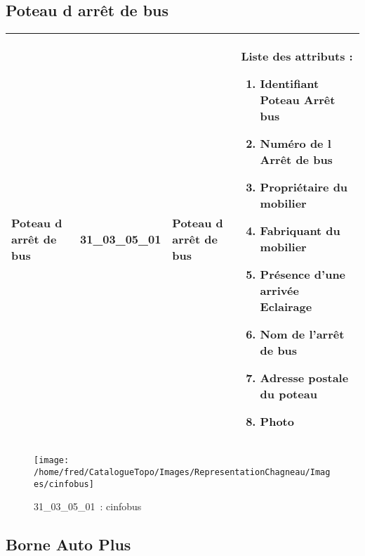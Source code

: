 \documentclass[12pt,titlepage]{book}
\begin{document}
\subsection{Poteau d arrêt de bus}
\noindent
\vspace{\baselineskip}

\renewcommand{\arraystretch}{1.2}
\begin{supertabular}{|p{10cm}|c|p{13cm}|p{12cm}|}
 Poteau d arrêt de bus & 31\_03\_05\_01 & Poteau d arrêt de bus & Liste des attributs :
\begin{enumerate}
  \item Identifiant Poteau Arrêt bus  \item Numéro de l Arrêt de bus  \item Propriétaire du mobilier  \item Fabriquant du mobilier  \item Présence d'une arrivée Eclairage  \item Nom de l'arrêt de bus  \item Adresse postale du poteau  \item Photo\end{enumerate}
\\
\hline
\end{supertabular}
\begin{figure}[h!]
  \hfill         %
  \begin{minipage}[t]{3cm}
    \begin{center}
      \texttt{[image: /home/fred/CatalogueTopo/Images/RepresentationChagneau/Images/cinfobus]}
      \caption[~31\_03\_05\_01]{\small{31\_03\_05\_01~:} \tiny{cinfobus}}\label{cinfobus}
    \end{center}
  \end{minipage}
\end{figure}


\subsection{Borne Auto Plus}
\noindent
\vspace{\baselineskip}
\end{document}
